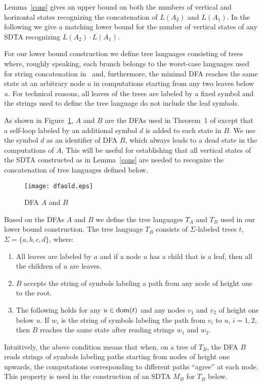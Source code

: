 \documentclass[copyright]{eptcs}
\begin{document}
Lemma~\ref{cons} gives an upper bound on both the numbers of
vertical and horizontal states recognizing the concatenation of
$L(A_2)$ and $L(A_1)$. In the following we give a matching lower
bound for the number of vertical states of any SDTA recognizing
$L(A_2) \cdot L(A_1)$.




For our lower bound construction we define tree languages
consisting of trees where, roughly speaking, each branch
belongs to the worst-case languages used for string concatenation
in~\cite{YuZhSa94} and, furthermore, the minimal DFA
reaches the same state at an arbitrary node $u$ in computations starting
from any two leaves below $u$. For technical reasons, all leaves
of the trees are labeled by a fixed symbol and the strings used to
define the tree language do not include the leaf symbols.

As shown in
Figure~\ref{f:dfa}, $A$ and $B$ are the DFAs used in Theorem~1 of
\cite{YuZhSa94} except that a self-loop labeled by
an additional symbol $d$ is added to
each state in $B$.
We use the symbol $d$ as an identifier of DFA $B$,
which always leads  to a dead state in the computations of $A$.
This will be useful for establishing that all vertical states
of the SDTA constructed as in Lemma~\ref{cons} are needed
to recognize the concatenation of tree languages defined below.

\begin{figure}
\centering
\texttt{[image: dfaold.eps]}
\caption{DFA $A$ and $B$}\label{f:dfa}
\end{figure}

Based on the DFAs $A$ and $B$ we define the tree languages
$T_A$ and $T_B$ used in our lower bound construction.
The tree language $T_B$ consists of $\Sigma$-labeled trees $t$,
$\Sigma = \{ a, b, c, d \}$, where:
\begin{enumerate}
\item All leaves are labeled
by $a$ and if a node $u$ has a child that is a leaf, then all the
children of $u$ are leaves.
\item $B$ accepts the string of symbols labeling
a path from any node of height one to the root.
\item The following
holds for any $u \in {\rm dom}(t)$ and any nodes
 $v_1$ and $v_2$
 of height one below $u$. If $w_i$ is the string
of symbols labeling the path from $v_i$ to $u$, $i = 1, 2$, then
$B$ reaches the same state after reading strings $w_1$ and $w_2$.
\end{enumerate}
Intuitively, the above condition means that when, on a tree of
$T_B$, the DFA $B$ reads strings of symbols labeling paths
starting from nodes of height one upwards, the computations
corresponding to different paths ``agree'' at each node. This
property is used in the construction of an SDTA $M_B$ for $T_B$
below.
\end{document}
